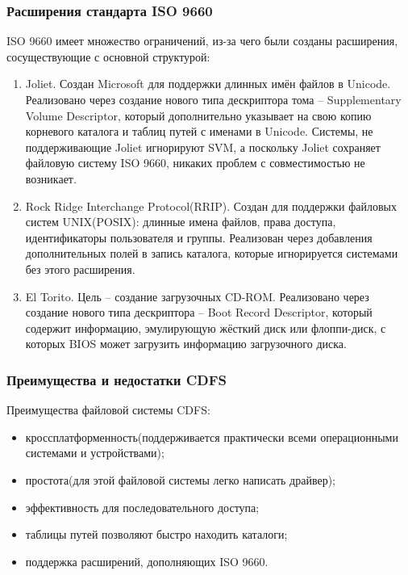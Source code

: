 \subsubsection{Расширения стандарта ISO 9660}

ISO 9660 имеет множество ограничений, из-за чего были созданы расширения, сосуществующие с основной структурой:

\begin{enumerate}
\item Joliet. Создан Microsoft для поддержки длинных имён файлов в Unicode. Реализовано через создание нового типа дескриптора тома -- Supplementary Volume Descriptor,
который дополнительно указывает на свою копию корневого каталога и таблиц путей с именами в Unicode. Системы, не поддерживающие Joliet игнорируют SVM,
а поскольку Joliet сохраняет файловую систему ISO 9660, никаких проблем с совместимостью не возникает.
\item Rock Ridge Interchange Protocol(RRIP). Создан для поддержки файловых систем UNIX(POSIX): длинные имена файлов, права доступа, идентификаторы пользователя и группы.
Реализован через добавления дополнительных полей в запись каталога, которые игнорируется системами без этого расширения.
\item El Torito. Цель -- создание загрузочных CD-ROM. Реализовано через создание нового типа дескриптора -- Boot Record Descriptor, который содержит информацию,
эмулирующую жёсткий диск или флоппи-диск, с которых BIOS может загрузить информацию загрузочного диска.
\end{enumerate}

\subsubsection{Преимущества и недостатки CDFS}

Преимущества файловой системы CDFS:

\begin{itemize}
\item кроссплатформенность(поддерживается практически всеми операционными системами и устройствами);
\item простота(для этой файловой системы легко написать драйвер);
\item эффективность для последовательного доступа;
\item таблицы путей позволяют быстро находить каталоги;
\item поддержка расширений, дополняющих ISO 9660.
\end{itemize}

